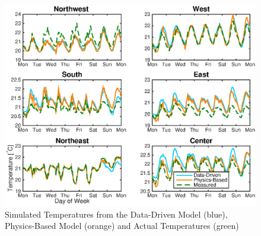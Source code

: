\begin{figure}
\centering
\vspace*{-0.1cm}
\includegraphics[scale=0.46]{chapters/building_model/figures/open_loop_traj.eps}
\vspace*{-0.5cm}
\caption{Simulated Temperatures from the Data-Driven Model (blue), Physics-Based Model (orange) and Actual Temperatures (green) }
\vspace*{-0.5cm}
\label{fig:open_loop_trajectories}
\end{figure}

